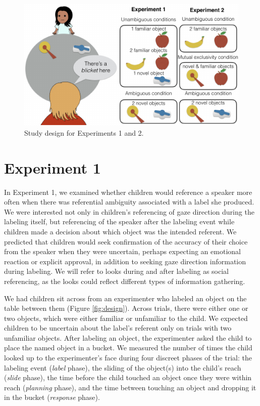 \documentclass[10pt, letterpaper]{article}
\newenvironment{CodeChunk}{}{}
\begin{document}
\begin{CodeChunk}
\captionsetup{width=0.8\columnwidth}\begin{figure}[h]

{\centering \includegraphics{figs/image_design-1} 

}

\caption[Study design for Experiments 1 and 2]{Study design for Experiments 1 and 2.}\label{fig:image_design}
\end{figure}
\end{CodeChunk}

\section{Experiment 1}\label{experiment-1}

In Experiment 1, we examined whether children would reference a speaker
more often when there was referential ambiguity associated with a label
she produced. We were interested not only in children's referencing of
gaze direction during the labeling itself, but referencing of the
speaker after the labeling event while children made a decision about
which object was the intended referent. We predicted that children would
seek confirmation of the accuracy of their choice from the speaker when
they were uncertain, perhaps expecting an emotional reaction or explicit
approval, in addition to seeking gaze direction information during
labeling. We will refer to looks during and after labeling as social
referencing, as the looks could reflect different types of information
gathering.

We had children sit across from an experimenter who labeled an object on
the table between them (Figure \ref{fig:design}). Across trials, there
were either one or two objects, which were either familiar or unfamiliar
to the child. We expected children to be uncertain about the label's
referent only on trials with two unfamiliar objects. After labeling an
object, the experimenter asked the child to place the named object in a
bucket. We measured the number of times the child looked up to the
experimenter's face during four discreet phases of the trial: the
labeling event (\emph{label} phase), the sliding of the object(s) into
the child's reach (\emph{slide} phase), the time before the child
touched an object once they were within reach (\emph{planning} phase),
and the time between touching an object and dropping it in the bucket
(\emph{response} phase).
\end{document}
